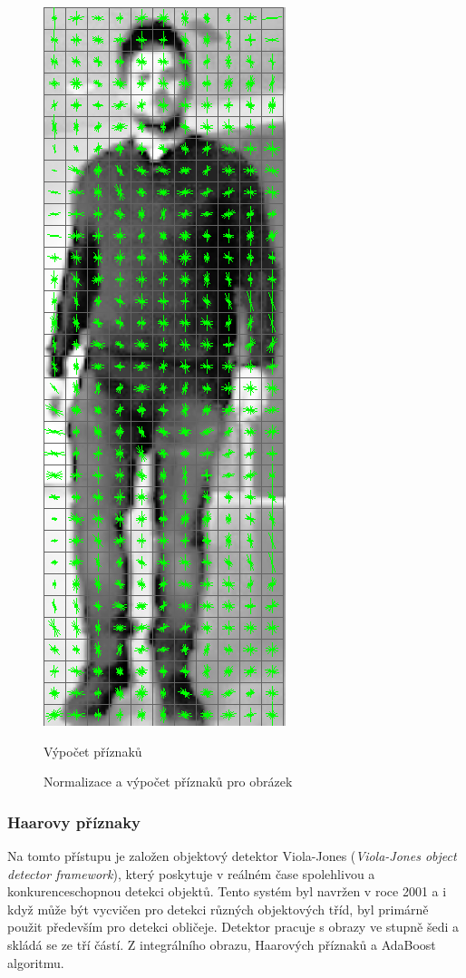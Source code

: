\begin{figure}[H]
\begin{minipage}{.3\textwidth}
  \includegraphics[width=.5\linewidth]{figures/features}
  \caption*{Výpočet příznaků}
  \label{fig:hog_features}
\end{minipage}
\caption{Normalizace a výpočet příznaků pro obrázek}
\label{fig:hogCalc}
\end{figure}

\subsubsection*{Haarovy příznaky} %
Na tomto přístupu je založen objektový detektor Viola-Jones (\textit{Viola-Jones object detector framework}), který poskytuje v reálném čase spolehlivou a konkurenceschopnou detekci objektů. Tento systém byl navržen v roce 2001 a i když může být vycvičen pro detekci různých objektových tříd, byl primárně použit především pro detekci obličeje. Detektor pracuje s obrazy ve stupně šedi a skládá se ze tří částí. Z integrálního obrazu, Haarových příznaků a AdaBoost algoritmu. 

